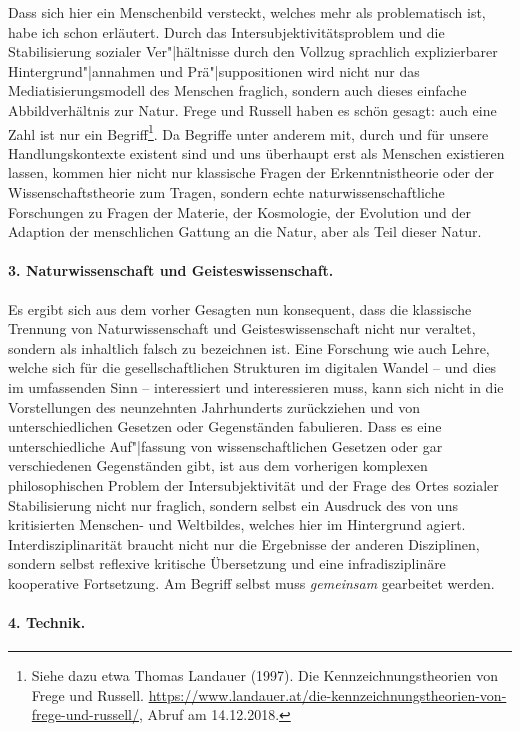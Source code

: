 \documentclass[12pt,a4paper]{article}
\begin{document}
Dass sich hier ein Menschenbild versteckt, welches mehr als problematisch ist,
habe ich schon erläutert. Durch das Intersubjektivitätsproblem und die
Stabilisierung sozialer Ver"|hältnisse durch den Vollzug sprachlich
explizierbarer Hintergrund"|annahmen und Prä"|suppositionen wird nicht nur das
Mediatisierungsmodell des Menschen fraglich, sondern auch dieses einfache
Abbildverhältnis zur Natur. Frege und Russell haben es schön gesagt: auch eine
Zahl ist nur ein Begriff\footnote{Siehe dazu etwa Thomas Landauer (1997). Die
  Kennzeichnungstheorien von Frege und Russell.
  \url{https://www.landauer.at/die-kennzeichnungstheorien-von-frege-und-russell/},
  Abruf am 14.12.2018.}. Da Begriffe unter anderem mit, durch und für unsere
Handlungskontexte existent sind und uns überhaupt erst als Menschen existieren
lassen, kommen hier nicht nur klassische Fragen der Erkenntnistheorie oder der
Wissenschaftstheorie zum Tragen, sondern echte naturwissenschaftliche
Forschungen zu Fragen der Materie, der Kosmologie, der Evolution und der
Adaption der menschlichen Gattung an die Natur, aber als Teil dieser Natur.

\paragraph{3. Naturwissenschaft und Geisteswissenschaft.}

Es ergibt sich aus dem vorher Gesagten nun konsequent, dass die klassische
Trennung von Naturwissenschaft und Geisteswissenschaft nicht nur veraltet,
sondern als inhaltlich falsch zu bezeichnen ist. Eine Forschung wie auch
Lehre, welche sich für die gesellschaftlichen Strukturen im digitalen Wandel –
und dies im umfassenden Sinn – interessiert und interessieren muss, kann sich
nicht in die Vorstellungen des neunzehnten Jahrhunderts zurückziehen und von
unterschiedlichen Gesetzen oder Gegenständen fabulieren. Dass es eine
unterschiedliche Auf"|fassung von wissenschaftlichen Gesetzen oder gar
verschiedenen Gegenständen gibt, ist aus dem vorherigen komplexen
philosophischen Problem der Intersubjektivität und der Frage des Ortes
sozialer Stabilisierung nicht nur fraglich, sondern selbst ein Ausdruck des
von uns kritisierten Menschen- und Weltbildes, welches hier im Hintergrund
agiert. Interdisziplinarität braucht nicht nur die Ergebnisse der anderen
Disziplinen, sondern selbst reflexive kritische Übersetzung und eine
infradisziplinäre kooperative Fortsetzung.  Am Begriff selbst muss
\emph{gemeinsam} gearbeitet werden.

\paragraph{4. Technik.}
\end{document}

